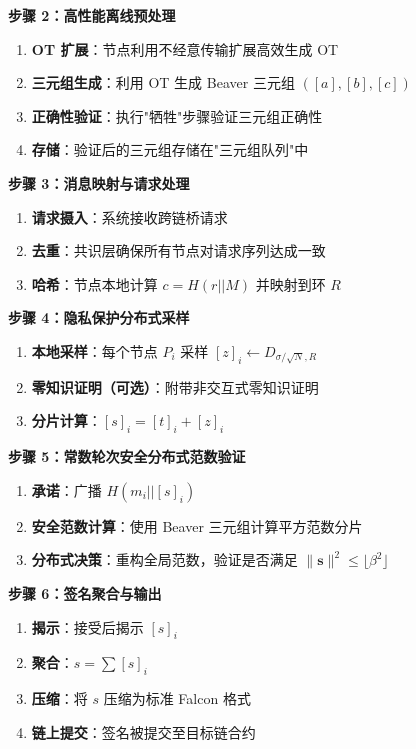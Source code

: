 \documentclass[12pt,a4paper]{article}
\begin{document}
\textbf{步骤 2：高性能离线预处理}

\begin{enumerate}
    \item \textbf{OT 扩展}：节点利用不经意传输扩展高效生成 OT
    \item \textbf{三元组生成}：利用 OT 生成 Beaver 三元组 $([a], [b], [c])$
    \item \textbf{正确性验证}：执行"牺牲"步骤验证三元组正确性
    \item \textbf{存储}：验证后的三元组存储在"三元组队列"中
\end{enumerate}

\textbf{步骤 3：消息映射与请求处理}

\begin{enumerate}
    \item \textbf{请求摄入}：系统接收跨链桥请求
    \item \textbf{去重}：共识层确保所有节点对请求序列达成一致
    \item \textbf{哈希}：节点本地计算 $c = H(r || M)$ 并映射到环 $R$
\end{enumerate}

\textbf{步骤 4：隐私保护分布式采样}

\begin{enumerate}
    \item \textbf{本地采样}：每个节点 $P_i$ 采样 $[z]_i \leftarrow D_{\sigma/\sqrt{N}, R}$
    \item \textbf{零知识证明（可选）}：附带非交互式零知识证明
    \item \textbf{分片计算}：$[s]_i = [t]_i + [z]_i$
\end{enumerate}

\textbf{步骤 5：常数轮次安全分布式范数验证}

\begin{enumerate}
    \item \textbf{承诺}：广播 $H(m_i || [s]_i)$
    \item \textbf{安全范数计算}：使用 Beaver 三元组计算平方范数分片
    \item \textbf{分布式决策}：重构全局范数，验证是否满足 $\|\mathbf{s}\|^2 \le \lfloor \beta^2 \rfloor$
\end{enumerate}

\textbf{步骤 6：签名聚合与输出}

\begin{enumerate}
    \item \textbf{揭示}：接受后揭示 $[s]_i$
    \item \textbf{聚合}：$s = \sum [s]_i$
    \item \textbf{压缩}：将 $s$ 压缩为标准 Falcon 格式
    \item \textbf{链上提交}：签名被提交至目标链合约
\end{enumerate}
\end{document}
